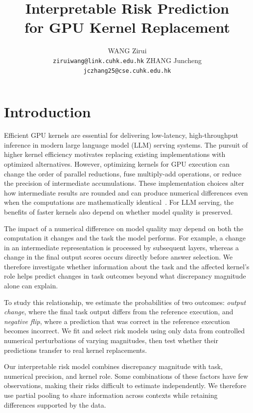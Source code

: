\documentclass{article}
\title{Interpretable Risk Prediction\\for GPU Kernel Replacement}
\author{%
  WANG Zirui \\
  \texttt{ziruiwang@link.cuhk.edu.hk}
  \And
  ZHANG Juncheng \\
  \texttt{jczhang25@cse.cuhk.edu.hk}
}
\begin{document}
\maketitle

\section{Introduction}

Efficient GPU kernels are essential for delivering low-latency, high-throughput inference in modern large language model (LLM) serving systems.
The pursuit of higher kernel efficiency motivates replacing existing implementations with optimized alternatives.
However, optimizing kernels for GPU execution can change the order of parallel reductions, fuse multiply-add operations, or reduce the precision of intermediate accumulations.
These implementation choices alter how intermediate results are rounded and can produce numerical differences even when the computations are mathematically identical~\citep{whitehead2011precision,pytorchNumericalAccuracy}.
For LLM serving, the benefits of faster kernels also depend on whether model quality is preserved.

The impact of a numerical difference on model quality may depend on both the computation it changes and the task the model performs.
For example, a change in an intermediate representation is processed by subsequent layers, whereas a change in the final output scores occurs directly before answer selection.
We therefore investigate whether information about the task and the affected kernel's role helps predict changes in task outcomes beyond what discrepancy magnitude alone can explain.

To study this relationship, we estimate the probabilities of two outcomes: \emph{output change}, where the final task output differs from the reference execution, and \emph{negative flip}, where a prediction that was correct in the reference execution becomes incorrect.
We fit and select risk models using only data from controlled numerical perturbations of varying magnitudes, then test whether their predictions transfer to real kernel replacements.

Our interpretable risk model combines discrepancy magnitude with task, numerical precision, and kernel role.
Some combinations of these factors have few observations, making their risks difficult to estimate independently.
We therefore use partial pooling to share information across contexts while retaining differences supported by the data.
\end{document}
